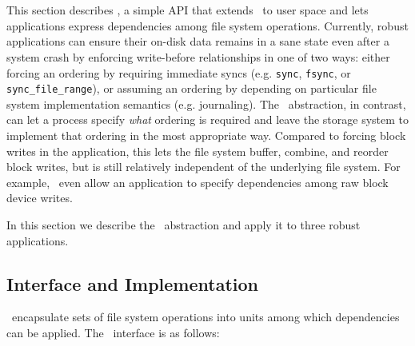 \section{\Patchgroups}
\label{sec:patchgroup}

\newcommand{\pgCreate}{\texttt{pg\_create}}
\newcommand{\pgDepend}{\texttt{pg\_depend}}
\newcommand{\pgEngage}{\texttt{pg\_engage}}
\newcommand{\pgDisengage}{\texttt{pg\_disengage}}
\newcommand{\pgRelease}{\texttt{pg\_release}}
\newcommand{\pgSync}{\texttt{pg\_sync}}
\newcommand{\pgClose}{\texttt{pg\_close}}


This section describes \emph{\patchgroups}, a simple API that extends \patches\ to user
space and lets applications express dependencies among file system
operations.
%
Currently,
robust applications
%
can ensure their on-disk data remains in a sane state even after a
system crash by enforcing write-before relationships in one of two ways:
%
either forcing an ordering by requiring immediate syncs
(e.g. \texttt{sync}, \texttt{fsync}, or \texttt{sync\_file\_range}),
%
or assuming an ordering by depending on particular file system implementation
semantics (e.g. journaling).
%
The \patch\ abstraction, in contrast, can let a process specify
\emph{what} ordering is required and leave the storage system to implement
that ordering in the most appropriate way.
%
Compared to forcing block writes in the application, this lets the file
system buffer, combine, and reorder block writes, but is still relatively
independent of the underlying file system.
%
For example, \patchgroups\ even allow an application to specify
dependencies among raw block device writes.


In this section we describe the \patchgroup\ abstraction
%
and apply it to three robust applications.


\subsection{Interface and Implementation}
\label{sec:patchgroup:interface}

\Patchgroups\ encapsulate sets of file system operations into units among
which dependencies can be applied.
%
%
The \patchgroup\ interface is as follows:

